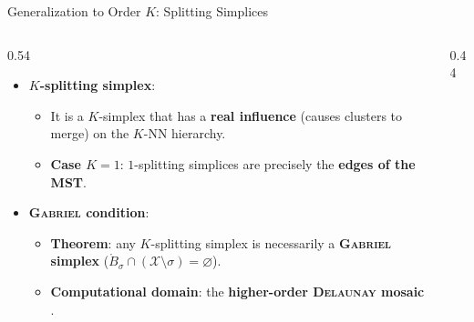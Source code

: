 \documentclass[A4,svgnames,9pt,aspectratio=169]{beamer}
\begin{document}
\begin{frame}{Generalization to Order $K$: Splitting Simplices}
    \begin{columns}[c, onlytextwidth]
        \begin{column}{0.54\textwidth}
            \begin{itemize}
                \setlength{\itemsep}{10pt}
                \item \textbf{$K$-splitting simplex}:
                \begin{itemize}
                    \item It is a $K$-simplex that has a \textbf{real influence} (causes clusters to merge) on the $K$-NN hierarchy.
                    \item \textbf{Case $K=1$}: $1$-splitting simplices are precisely the \textbf{edges of the MST}.
                \end{itemize}
                \item \textbf{\textsc{Gabriel} condition}:
                \begin{itemize}
                    \item \textbf{Theorem}: any $K$-splitting simplex is necessarily a \textbf{\textsc{Gabriel} simplex} ($\mathring{B}_\sigma \cap (\mathcal{X} \setminus \sigma) = \varnothing$).
                    \item \textbf{Computational domain}: the \textbf{higher-order \textsc{Delaunay} mosaic} \cite{osangEdelsbrunner2023algorithm}.
                \end{itemize}
            \end{itemize}
        \end{column}
        
        \begin{column}{0.44\textwidth}
            \begin{center}
\end{center}
\end{column}
\end{columns}
\end{frame}
\end{document}
